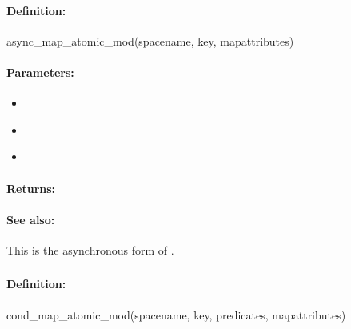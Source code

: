 \paragraph{Definition:}
\begin{rubycode}
async_map_atomic_mod(spacename, key, mapattributes)
\end{rubycode}

\paragraph{Parameters:}
\begin{itemize}[noitemsep]
\item {}\\

\item {}\\

\item {}\\

\end{itemize}

\paragraph{Returns:}


\paragraph{See also:}  This is the asynchronous form of .

\pagebreak
\subsubsection{}
\label{api:ruby:cond_map_atomic_mod}


\paragraph{Definition:}
\begin{rubycode}
cond_map_atomic_mod(spacename, key, predicates, mapattributes)
\end{rubycode}

